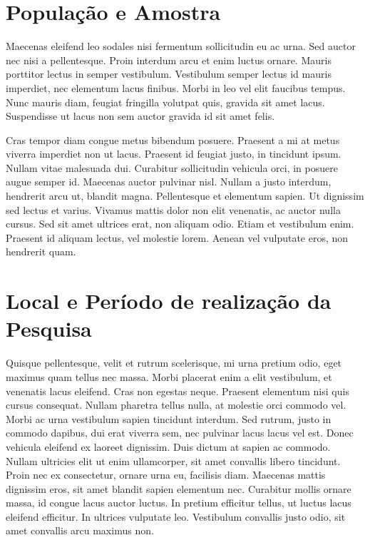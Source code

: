 \documentclass[
	12pt,				%
	a4paper,			%
    openany,
    oneside,
	english,			%
	french,				%
	spanish,			%
	brazil,				%
	]{abntex2}
\begin{document}
\section{População e Amostra}

Maecenas eleifend leo sodales nisi fermentum sollicitudin eu ac urna. Sed auctor nec nisi a pellentesque. Proin interdum arcu et enim luctus ornare. Mauris porttitor lectus in semper vestibulum. Vestibulum semper lectus id mauris imperdiet, nec elementum lacus finibus. Morbi in leo vel elit faucibus tempus. Nunc mauris diam, feugiat fringilla volutpat quis, gravida sit amet lacus. Suspendisse ut lacus non sem auctor gravida id sit amet felis.

Cras tempor diam congue metus bibendum posuere. Praesent a mi at metus viverra imperdiet non ut lacus. Praesent id feugiat justo, in tincidunt ipsum. Nullam vitae malesuada dui. Curabitur sollicitudin vehicula orci, in posuere augue semper id. Maecenas auctor pulvinar nisl. Nullam a justo interdum, hendrerit arcu ut, blandit magna. Pellentesque et elementum sapien. Ut dignissim sed lectus et varius. Vivamus mattis dolor non elit venenatis, ac auctor nulla cursus. Sed sit amet ultrices erat, non aliquam odio. Etiam et vestibulum enim. Praesent id aliquam lectus, vel molestie lorem. Aenean vel vulputate eros, non hendrerit quam. 

\section{Local e Período de realização da Pesquisa}

Quisque pellentesque, velit et rutrum scelerisque, mi urna pretium odio, eget maximus quam tellus nec massa. Morbi placerat enim a elit vestibulum, et venenatis lacus eleifend. Cras non egestas neque. Praesent elementum nisi quis cursus consequat. Nullam pharetra tellus nulla, at molestie orci commodo vel. Morbi ac urna vestibulum sapien tincidunt interdum. Sed rutrum, justo in commodo dapibus, dui erat viverra sem, nec pulvinar lacus lacus vel est. Donec vehicula eleifend ex laoreet dignissim. Duis dictum at sapien ac commodo. Nullam ultricies elit ut enim ullamcorper, sit amet convallis libero tincidunt. Proin nec ex consectetur, ornare urna eu, facilisis diam. Maecenas mattis dignissim eros, sit amet blandit sapien elementum nec. Curabitur mollis ornare massa, id congue lacus auctor luctus. In pretium efficitur tellus, ut luctus lacus eleifend efficitur. In ultrices vulputate leo. Vestibulum convallis justo odio, sit amet convallis arcu maximus non.
 
\end{document}
